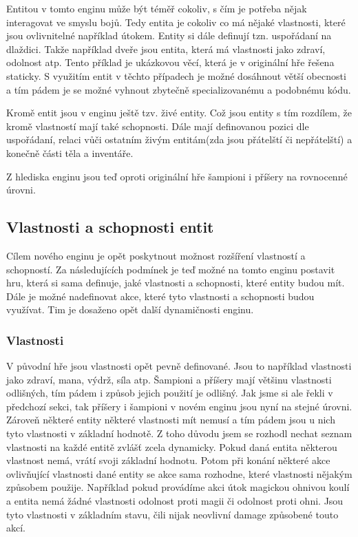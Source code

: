 Entitou v tomto enginu může být téměř cokoliv, s čím je potřeba nějak interagovat ve smyslu bojů. Tedy entita je cokoliv co má nějaké vlastnosti,
které jsou ovlivnitelné například útokem.
Entity si dále definují tzn. uspořádaní na dlaždici. Takže například dveře jsou entita, která má vlastnosti jako zdraví, odolnost atp.
Tento příklad je ukázkovou věcí, která je v originální hře řešena staticky. S využitím entit v těchto případech je možné dosáhnout  větší obecnosti
a tím pádem je se možné vyhnout zbytečně specializovanému a podobnému kódu.

Kromě entit jsou v enginu ještě tzv. živé entity. Což jsou entity s tím rozdílem, že kromě vlastností mají také schopnosti.
Dále mají definovanou pozici dle uspořádaní, relaci vůči ostatním živým entitám(zda jsou přátelští či nepřátelští) a 
konečně části těla a inventáře.

Z hlediska enginu jsou teď oproti originální hře šampioni i příšery na rovnocenné úrovni.

\subsection{Vlastnosti a schopnosti entit}
Cílem nového enginu je opět poskytnout možnost rozšíření vlastností a schopností.
Za následujících podmínek je teď možné na tomto enginu postavit hru, která si sama definuje, jaké vlastnosti a schopnosti, které entity budou mít.
Dále je možné nadefinovat akce, které tyto vlastnosti a schopnosti budou využívat. Tim je dosaženo opět další dynamičnosti enginu.

\subsubsection{Vlastnosti}
V původní hře jsou vlastnosti opět pevně definované. Jsou to například vlastnosti jako zdraví, mana, výdrž, síla atp.
Šampioni a příšery mají většinu vlastnosti odlišných, tím pádem i způsob jejich použití je odlišný. Jak jsme si ale řekli v předchozí sekci,
tak příšery i šampioni v novém enginu jsou nyní na stejné úrovni. Zároveň některé entity některé vlastnosti mít nemusí a tím pádem jsou u nich 
tyto vlastnosti v základní hodnotě. Z toho důvodu jsem se rozhodl nechat seznam vlastnosti na každé entitě zvlášť zcela dynamicky.
Pokud daná entita některou vlastnost nemá, vrátí svoji základní hodnotu. Potom při konání některé akce ovlivňující vlastnosti dané entity se
 akce sama rozhodne, které vlastnosti nějakým způsobem použije. Například pokud provádíme akci útok magickou ohnivou koulí a entita nemá žádné vlastnosti 
 odolnost proti magii či odolnost proti ohni. Jsou tyto vlastnosti v základním stavu, čili nijak neovlivní damage způsobené touto akcí.

